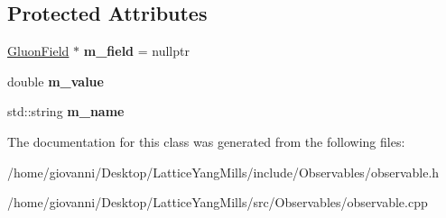 \subsection*{Protected Attributes}
\begin{DoxyCompactItemize}
\item 
\hyperlink{classField}{Gluon\+Field} $\ast$ {\bfseries m\+\_\+field} = nullptr\hypertarget{classObservable_a3f3b97a6ccf3662fc4285e0249fc7e55}{}\label{classObservable_a3f3b97a6ccf3662fc4285e0249fc7e55}

\item 
double {\bfseries m\+\_\+value}\hypertarget{classObservable_a65689c61e83937902110f9da43b4a327}{}\label{classObservable_a65689c61e83937902110f9da43b4a327}

\item 
std\+::string {\bfseries m\+\_\+name}\hypertarget{classObservable_ac48d8fce3be9fefa7af3bb3cd4e01e06}{}\label{classObservable_ac48d8fce3be9fefa7af3bb3cd4e01e06}

\end{DoxyCompactItemize}


The documentation for this class was generated from the following files\+:\begin{DoxyCompactItemize}
\item 
/home/giovanni/\+Desktop/\+Lattice\+Yang\+Mills/include/\+Observables/observable.\+h\item 
/home/giovanni/\+Desktop/\+Lattice\+Yang\+Mills/src/\+Observables/observable.\+cpp\end{DoxyCompactItemize}
